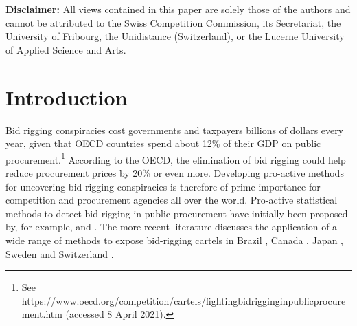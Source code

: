 \documentclass[a4paper,11pt]{article}
\begin{document}
	
	{\small \smallskip }
	{\small \smallskip }
	{\small \smallskip }
	
	{\small \noindent \textbf{Disclaimer:}  All views contained in this paper are solely those of the authors and cannot be attributed to the Swiss Competition Commission, its Secretariat, the University of Fribourg, the Unidistance (Switzerland), or the Lucerne University of Applied Science and Arts.}
	
	{\small \smallskip }
	{\small \smallskip }
	{\small \smallskip }
	
	{\small {}\thispagestyle{empty}\pagebreak  }
	
	
	{\small \renewcommand{\thefootnote}{\arabic{footnote}} %
		\setcounter{footnote}{0}  \pagebreak \setcounter{footnote}{0} \pagebreak %
		\setcounter{page}{1} }
	
	\section{Introduction}\label{introduction}
	Bid rigging conspiracies cost governments and taxpayers billions of dollars every year, given that OECD countries spend about 12\% of their GDP on public procurement.\footnote{See https://www.oecd.org/competition/cartels/fightingbidrigginginpublicprocurement.htm (accessed 8 April 2021).} According to the OECD, the elimination of bid rigging could help reduce procurement prices by 20\% or even more. Developing pro-active methods for uncovering bid-rigging conspiracies is therefore of prime importance for competition and procurement agencies all over the world. Pro-active statistical methods to detect bid rigging in public procurement have initially been proposed by, for example, \cite{Harrington2008} and \cite{Porter1993}. The more recent literature discusses the application of a wide range of methods to expose bid-rigging cartels in Brazil \citep[][]{lima2021using}, Canada \citep[][]{clark2018bid}, Japan \citep[][]{Chassang2020}, Sweden \citep[][]{bergman2020interactions} and Switzerland \citep[][]{huber2019machine,imhof2019detecting}.
	
\end{document}
